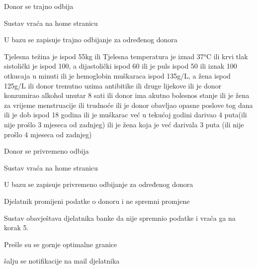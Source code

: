 \begin{packed_item}
\begin{packed_item}
\begin{packed_enum}
			\item Donor se trajno odbija
			\item Sustav vraća na home stranicu
			\item U bazu se zapisuje trajno odbijanje za određenog donora
		\end{packed_enum}
\eject
		\item[4.b] {Tjelesna težina je ispod 55kg ili Tjelesna temperatura je iznad 37°C ili krvi tlak sistolički je ispod 100, a dijastolički ispod 60 ili je puls ispod 50 ili iznak 100 otkucaja u minuti ili je hemoglobin muškaraca ispod 135g/L, a žena ispod 125g/L ili donor trenutno uzima antibitike ili druge lijekove ili je donor konzumirao alkohol unutar 8 sati  ili donor ima akutno bolesnos stanje ili je žena za vrijeme menstruacije ili trudnoće ili je donor obavljao opasne poslove tog dana ili je dob ispod 18 godina ili je muškarac već u tekućoj godini darivao 4 puta(ili nije prošlo 3 mjeseca od zadnjeg) ili je žena koja je već darivala 3 puta (ili nije prošlo 4 mjeseca od zadnjeg)}
		\item[] \begin{packed_enum}
			
			\item Donor se privremeno odbija
			\item Sustav vraća na home stranicu
			\item U bazu se zapisuje privremeno odbijanje za određenog donora
			\end{packed_enum}
		\item[5.a] {Djelatnik promijeni podatke o donoru i ne spremni promjene}
		\item[] \begin{packed_enum}
			
			\item Sustav obavještava djelatnika banke da nije spremnio podatke i vraća ga na korak 5.
			\end{packed_enum}
		\item[8.a] {Prešle su se gornje optimalne granice}
		\item[] \begin{packed_enum}
			
			\item šalju se notifikacije na mail djelatnika
			
		\end{packed_enum}
	\end{packed_item}
	
\end{packed_item}
\eject 
